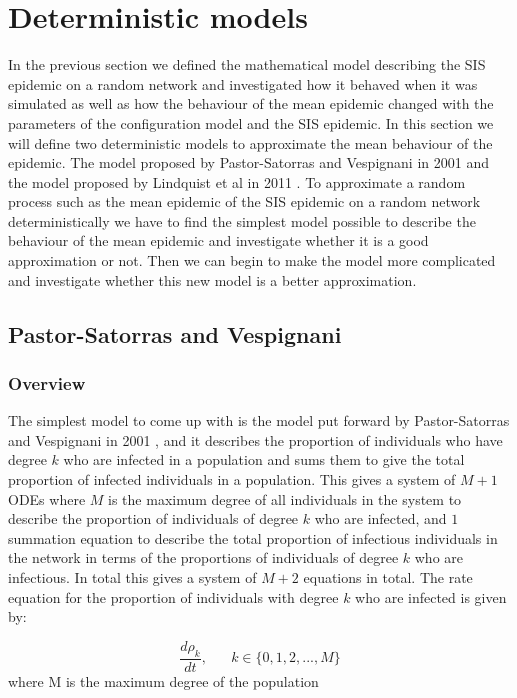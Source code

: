 \documentclass{uonmathsreport}
\begin{document}
\newpage
\section{Deterministic models} \label{sec:6}
\indent
In the previous section we defined the mathematical model describing the SIS epidemic on a random network and investigated how it behaved when it was simulated as well as how the behaviour of the mean epidemic changed with the parameters of the configuration model and the SIS epidemic. In this section we will define two deterministic models to approximate the mean behaviour of the epidemic. The model proposed by Pastor-Satorras and Vespignani in 2001 \cite{bibpastor} and the model proposed by Lindquist et al in 2011 \cite{biblindquist}. To approximate a random process such as the mean epidemic of the SIS epidemic on a random network deterministically we have to find the simplest model possible to describe the behaviour of the mean epidemic and investigate whether it is a good approximation or not. Then we can begin to make the model more complicated and investigate whether this new model is a better approximation.

\subsection{Pastor-Satorras and Vespignani} \label{subsec:6.1}

\subsubsection{Overview} \label{subsub:6.1.1}
\indent 
The simplest model to come up with is the model put forward by Pastor-Satorras and Vespignani in 2001 \cite{bibpastor} , and it describes the proportion of individuals who have degree $k$ who are infected in a population and sums them to give the total proportion of infected individuals in a population. This gives a system of $M+1$ ODEs where $M$ is the maximum degree of all individuals in the system to describe the proportion of individuals of degree $k$ who are infected, and $1$ summation equation to describe the total proportion of infectious individuals in the network in terms of the proportions of individuals of degree $k$ who are infectious. In total this gives a system of $M+2$ equations in total. The rate equation for the proportion of individuals with degree $k$ who are infected is given by:

\begin{equation}
\frac{d\rho_k}{dt},	\,\,\,\,\,\,\,\,\,\, k \in \{0,1,2,...,M\}
\end{equation}
\noindent
where M is the maximum degree of the population
\end{document}
